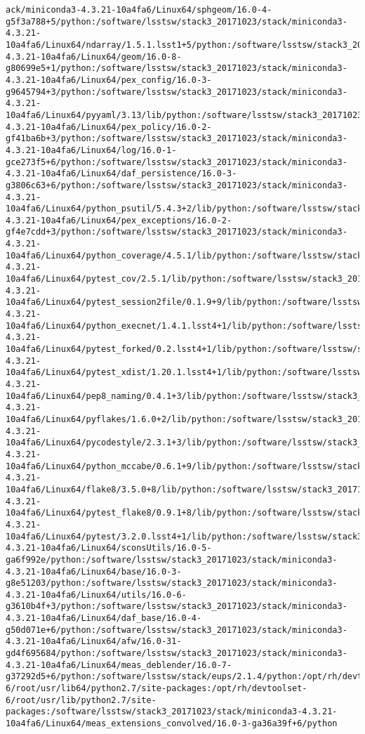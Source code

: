 \begin{verbatim}
ack/miniconda3-4.3.21-10a4fa6/Linux64/sphgeom/16.0-4-g5f3a788+5/python:/software/lsstsw/stack3_20171023/stack/miniconda3-4.3.21-10a4fa6/Linux64/ndarray/1.5.1.lsst1+5/python:/software/lsstsw/stack3_20171023/stack/miniconda3-4.3.21-10a4fa6/Linux64/geom/16.0-8-g80699e5+1/python:/software/lsstsw/stack3_20171023/stack/miniconda3-4.3.21-10a4fa6/Linux64/pex_config/16.0-3-g9645794+3/python:/software/lsstsw/stack3_20171023/stack/miniconda3-4.3.21-10a4fa6/Linux64/pyyaml/3.13/lib/python:/software/lsstsw/stack3_20171023/stack/miniconda3-4.3.21-10a4fa6/Linux64/pex_policy/16.0-2-gf41ba6b+3/python:/software/lsstsw/stack3_20171023/stack/miniconda3-4.3.21-10a4fa6/Linux64/log/16.0-1-gce273f5+6/python:/software/lsstsw/stack3_20171023/stack/miniconda3-4.3.21-10a4fa6/Linux64/daf_persistence/16.0-3-g3806c63+6/python:/software/lsstsw/stack3_20171023/stack/miniconda3-4.3.21-10a4fa6/Linux64/python_psutil/5.4.3+2/lib/python:/software/lsstsw/stack3_20171023/stack/miniconda3-4.3.21-10a4fa6/Linux64/pex_exceptions/16.0-2-gf4e7cdd+3/python:/software/lsstsw/stack3_20171023/stack/miniconda3-4.3.21-10a4fa6/Linux64/python_coverage/4.5.1/lib/python:/software/lsstsw/stack3_20171023/stack/miniconda3-4.3.21-10a4fa6/Linux64/pytest_cov/2.5.1/lib/python:/software/lsstsw/stack3_20171023/stack/miniconda3-4.3.21-10a4fa6/Linux64/pytest_session2file/0.1.9+9/lib/python:/software/lsstsw/stack3_20171023/stack/miniconda3-4.3.21-10a4fa6/Linux64/python_execnet/1.4.1.lsst4+1/lib/python:/software/lsstsw/stack3_20171023/stack/miniconda3-4.3.21-10a4fa6/Linux64/pytest_forked/0.2.lsst4+1/lib/python:/software/lsstsw/stack3_20171023/stack/miniconda3-4.3.21-10a4fa6/Linux64/pytest_xdist/1.20.1.lsst4+1/lib/python:/software/lsstsw/stack3_20171023/stack/miniconda3-4.3.21-10a4fa6/Linux64/pep8_naming/0.4.1+3/lib/python:/software/lsstsw/stack3_20171023/stack/miniconda3-4.3.21-10a4fa6/Linux64/pyflakes/1.6.0+2/lib/python:/software/lsstsw/stack3_20171023/stack/miniconda3-4.3.21-10a4fa6/Linux64/pycodestyle/2.3.1+3/lib/python:/software/lsstsw/stack3_20171023/stack/miniconda3-4.3.21-10a4fa6/Linux64/python_mccabe/0.6.1+9/lib/python:/software/lsstsw/stack3_20171023/stack/miniconda3-4.3.21-10a4fa6/Linux64/flake8/3.5.0+8/lib/python:/software/lsstsw/stack3_20171023/stack/miniconda3-4.3.21-10a4fa6/Linux64/pytest_flake8/0.9.1+8/lib/python:/software/lsstsw/stack3_20171023/stack/miniconda3-4.3.21-10a4fa6/Linux64/pytest/3.2.0.lsst4+1/lib/python:/software/lsstsw/stack3_20171023/stack/miniconda3-4.3.21-10a4fa6/Linux64/sconsUtils/16.0-5-ga6f992e/python:/software/lsstsw/stack3_20171023/stack/miniconda3-4.3.21-10a4fa6/Linux64/base/16.0-3-g8e51203/python:/software/lsstsw/stack3_20171023/stack/miniconda3-4.3.21-10a4fa6/Linux64/utils/16.0-6-g3610b4f+3/python:/software/lsstsw/stack3_20171023/stack/miniconda3-4.3.21-10a4fa6/Linux64/daf_base/16.0-4-g50d071e+6/python:/software/lsstsw/stack3_20171023/stack/miniconda3-4.3.21-10a4fa6/Linux64/afw/16.0-31-gd4f695684/python:/software/lsstsw/stack3_20171023/stack/miniconda3-4.3.21-10a4fa6/Linux64/meas_deblender/16.0-7-g37292d5+6/python:/software/lsstsw/stack/eups/2.1.4/python:/opt/rh/devtoolset-6/root/usr/lib64/python2.7/site-packages:/opt/rh/devtoolset-6/root/usr/lib/python2.7/site-packages:/software/lsstsw/stack3_20171023/stack/miniconda3-4.3.21-10a4fa6/Linux64/meas_extensions_convolved/16.0-3-ga36a39f+6/python

\end{verbatim}
